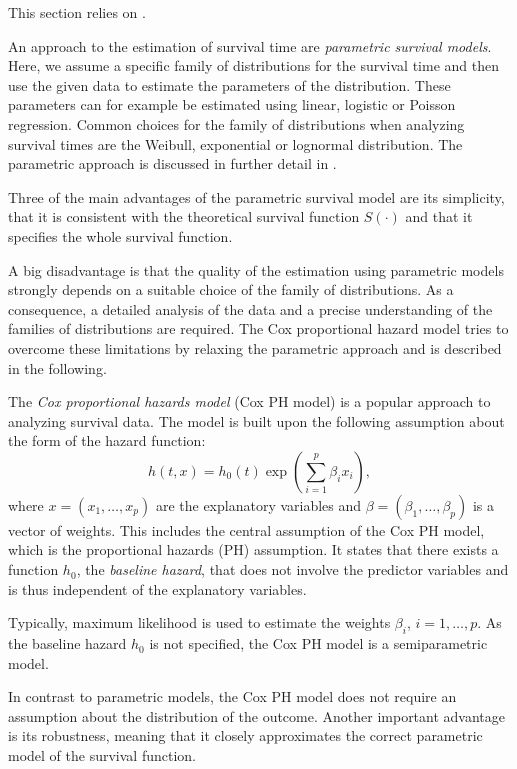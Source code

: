 \documentclass[12pt, a4paper]{scrartcl}
\theoremstyle{definition}
\theoremstyle{plain}
\numberwithin{equation}{section}
\numberwithin{figure}{section}
\numberwithin{table}{section}
\begin{document}
	This section relies on \citet*{sabook}.
	
	An approach to the estimation of survival time are \emph{parametric survival models}.
	Here, we assume a specific family of distributions for the survival time and then use the given data to estimate the parameters of the distribution.
	These parameters can for example be estimated using linear, logistic or Poisson regression.
	Common choices for the family of distributions when analyzing survival times are the Weibull, exponential or lognormal distribution.
	The parametric approach is discussed in further detail in \citet*{sabook}.
	
	Three of the main advantages of the parametric survival model are its simplicity,  that it is consistent with the theoretical survival function $S(\cdot)$ and that it specifies the whole survival function.
	
	A big disadvantage is that the quality of the estimation using parametric models strongly depends on a suitable choice of the family of distributions.
	As a consequence, a detailed analysis of the data and a precise understanding of the families of distributions are required.
	The Cox proportional hazard model tries to overcome these limitations by relaxing the parametric approach and is described in the following.
	
	The \emph{Cox proportional hazards model} (Cox PH model) is a popular approach to analyzing survival data.
	The model is built upon the following assumption about the form of the hazard function:
	\begin{equation*}
	h(t,x) = h_0(t) \exp \left(\sum_{i=1}^p \beta_i x_i\right),
	\end{equation*}
	where $x=(x_1,\dots,x_p)$ are the explanatory variables and $\beta = (\beta_1,\dots, \beta_p)$ is a vector of weights.
	This includes the central assumption of the Cox PH model, which is the proportional hazards (PH) assumption.
	It states that there exists a function $h_0$, the \emph{baseline hazard}, that does not involve the predictor variables and is thus independent of the explanatory variables.

	Typically, maximum likelihood is used to estimate the weights $\beta_i$, $i=1,\dots ,p$.
	As the baseline hazard $h_0$ is not specified, the Cox PH model is a semiparametric model.
	
	In contrast to parametric models, the Cox PH model does not require an assumption about the distribution of the outcome.
	Another important advantage is its robustness, meaning that it closely approximates the correct parametric model of the survival function.
	
\end{document}
